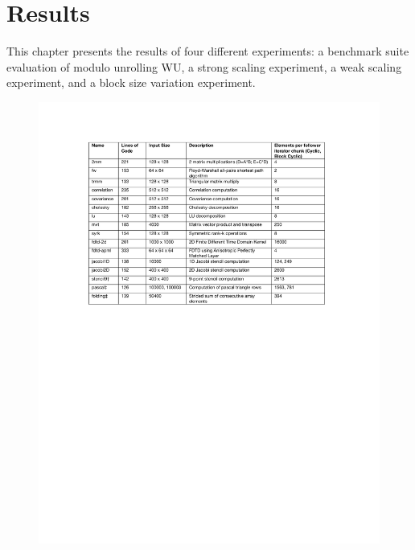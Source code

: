 
\renewcommand{\thechapter}{8}

\chapter{Results}\label{sec:results}


This chapter presents the results of four different experiments: a benchmark suite evaluation of modulo unrolling WU, a strong scaling experiment, a weak scaling experiment, and a block size variation experiment. 

\begin{figure}
\begin{center}
\includegraphics[width=\linewidth]{./Figures/Benchmarks.pdf}
\renewcommand{\baselinestretch}{1}

\end{center}
\end{figure}
